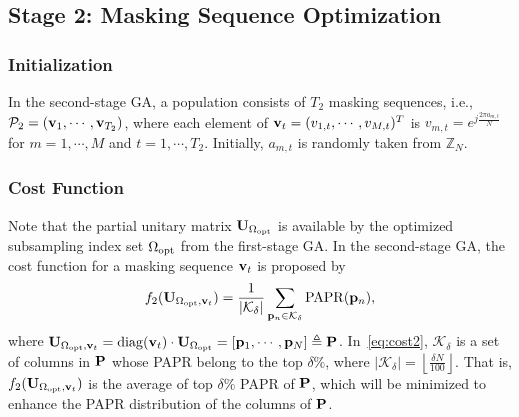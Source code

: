\documentclass[journal]{IEEEtran}
\newcommand{\Z}{\ensuremath{\mathbb Z}}
\newcommand{\mK}{\mathcal{K}}
\newcommand{\mP}{\mathcal{P}}
\newcommand{\pbu}{{\bf p}}
\newcommand{\vbu}{{\bf v}}
\newcommand{\Pbu}{{\bf P}}
\newcommand{\Ubu}{{\bf U}}
\numberwithin{const2}{const}
\begin{document}
\subsection{Stage 2: Masking Sequence Optimization}


\subsubsection{Initialization}
In the second-stage GA, a population consists of $T_2$ masking sequences, i.e.,
$\mP_2 = (\vbu_1, \cdots, \vbu_{T_2})$, where
each element of $\vbu_t = (v_{1, t}, \cdots, v_{M, t})^T$ %
is $ v_{m, t} = e^{j \frac{2 \pi a_{m, t}}{N}}$ for $m = 1, \cdots, M$ and $t = 1, \cdots, T_2$.
Initially, $a_{m, t} $ is randomly taken from $\Z_N$.


\subsubsection{Cost Function}
Note that the partial unitary matrix $\Ubu_{\Omega_{\rm opt}}$
is available %
by the optimized subsampling index set $\Omega_{\rm opt}$ from the first-stage GA.
In the second-stage GA, the cost function for a masking sequence $\vbu_t$ is proposed by
\begin{equation}\label{eq:cost2}
	f_2(\Ubu_{\Omega_{\rm opt}, \vbu_t}) = \frac{1}{|\mK_\delta|}\sum_{\pbu_n \in \mK_\delta} {\rm PAPR} (\pbu_n)  ,
\end{equation}
where $\Ubu_{\Omega_{\rm opt}, \vbu_t} = {\rm diag}(\vbu_t) \cdot \Ubu_{\Omega_{\rm opt}}
= [\pbu_1, \cdots, \pbu_N] \triangleq \Pbu$.
In~\eqref{eq:cost2}, $\mK_\delta$ is a set of columns in $\Pbu$
whose PAPR belong to the top $ \delta  \%$, where $|\mK_\delta| = \left\lfloor \frac{\delta N}{100} \right\rfloor$.
That is, $f_2(\Ubu_{\Omega_{\rm opt}, \vbu_t}) $ is the average of top $\delta \%$ PAPR
of $\Pbu$, which will be minimized %
to enhance the PAPR distribution
of the columns of $\Pbu$. 
\end{document}
